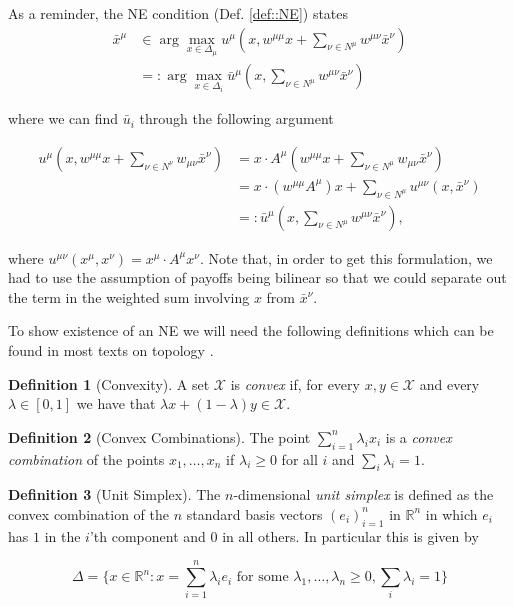 \documentclass{article}
\theoremstyle{definition}
\newtheorem{definition}{Definition}
\newcommand{\xmu}{x^{\mu}}
\newcommand{\NE}[1]{\bar{x}^{#1}}
\begin{document}
  As a reminder, the NE condition (Def. \ref{def::NE}) states
%
  \begin{align}
    \NE{\mu} &\in \arg\max_{x \in \Delta_\mu} u^\mu(x, w^{\mu \mu}x + \sum_{\nu \in N^\mu} w^{\mu \nu} \NE{\nu}) \nonumber \\
    & =: \arg\max_{x \in \Delta_i} \bar{u}^\mu(x, \sum_{\nu \in N^\mu} w^{\mu \nu} \NE{\nu})
  \end{align}

  where we can find $\bar{u}_i$ through the following argument
  
  \begin{align}
    u^\mu(x, w^{\mu \mu} x + \sum_{\nu \in N^\nu} w_{\mu \nu} \NE{\nu}) & = x \cdot A^\mu (w^{\mu \mu} x + \sum_{\nu \in N^\mu} w_{\mu \nu} \NE{\nu}) \\
     & = x \cdot (w^{\mu \mu} A^\mu)  x + \sum_{\nu \in N^\mu} u^{\mu \nu}(x, \NE{\nu}) \\
     & =: \bar{u}^\mu(x, \sum_{\nu \in N^\mu} w^{\mu \nu} \NE{\nu}), \nonumber
  \end{align}
  
  where $u^{\mu \nu}(\xmu, x^\nu) = \xmu \cdot A^\mu x^\nu$. Note
  that, in order to get this formulation, we had to use the assumption
  of payoffs being bilinear so that we could separate out the term in
  the weighted sum involving $x$ from $\bar{x}^\nu$.
  
  To show existence of an NE we will need the following definitions which can be found in most texts on topology \cite{Munkres}.
  
  \begin{definition}[Convexity]
  	A set $\mathcal{X}$ is \emph{convex} if, for every $x, y \in \mathcal{X}$ and every $\lambda \in [0, 1]$ we have that $\lambda x + (1 - \lambda)y \in \mathcal{X}$.
  \end{definition}

	\begin{definition}[Convex Combinations]
		The point $\sum_{i = 1}^{n} \lambda_i x_i$ is a \emph{convex combination} of the points $x_1, \ldots, x_n$ if $\lambda_i \geq 0$ for all $i$ and $\sum_i \lambda_i = 1$.
	\end{definition}

	\begin{definition}[Unit Simplex]
		The $n$-dimensional \emph{unit simplex} is defined as the convex combination of the $n$ standard basis vectors $(e_i)_{i = 1}^n$ in $\mathbb{R}^n$ in which $e_i$ has $1$ in the $i$'th component and $0$ in all others. In particular this is given by
		
		\begin{equation}
			\Delta = \{x \in \mathbb{R}^n : x = \sum_{i = 1}^n \lambda_i e_i \text{ for some } \lambda_1, \ldots, \lambda_n \geq 0, \sum_i \lambda_i = 1\}
		\end{equation}
	\end{definition}
	
\end{document}
